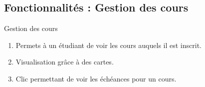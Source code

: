 \documentclass[numbering=fraction,10pt]{beamer}
\begin{document}
\subsection{Fonctionnalités : Gestion des cours}
\begin{frame}{Gestion des cours}
    \begin{enumerate}
        \item Permets à un étudiant de voir les cours auquels il est inscrit.
        \item Visualisation grâce à des cartes.
        \item Clic permettant de voir les échéances pour un cours.
    \end{enumerate}
\end{frame}
\end{document}
